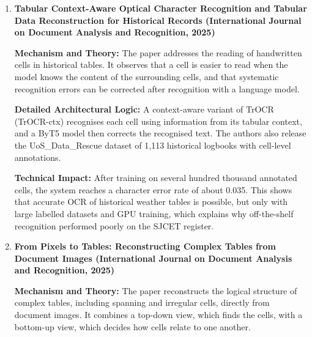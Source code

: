 \begin{enumerate}
\textbf{Detailed Architectural Logic:} A CascadeTabNet detector \cite{ref9} is trained on a small labelled set and then refined semi-supervised on unlabelled pages. The approach is evaluated on the GloSAT historical-logbook dataset together with the ICDAR-2019 and PubTabNet benchmarks.

\textbf{Technical Impact:} Semi-supervised training improves structure recognition on historical tables with limited annotation. The method recognises structure only, not cell text, so its errors propagate to the recognition stage and the output still needs validation. It informed the OCR route that was prototyped for the SJCET register.

\item \textbf{Tabular Context-Aware Optical Character Recognition and Tabular Data Reconstruction for Historical Records (International Journal on Document Analysis and Recognition, 2025)}

\textbf{Mechanism and Theory:} The paper addresses the reading of handwritten cells in historical tables. It observes that a cell is easier to read when the model knows the content of the surrounding cells, and that systematic recognition errors can be corrected after recognition with a language model.

\textbf{Detailed Architectural Logic:} A context-aware variant of TrOCR (TrOCR-ctx) recognises each cell using information from its tabular context, and a ByT5 model then corrects the recognised text. The authors also release the UoS\_Data\_Rescue dataset of 1,113 historical logbooks with cell-level annotations.

\textbf{Technical Impact:} After training on several hundred thousand annotated cells, the system reaches a character error rate of about 0.035. This shows that accurate OCR of historical weather tables is possible, but only with large labelled datasets and GPU training, which explains why off-the-shelf recognition performed poorly on the SJCET register.

\item \textbf{From Pixels to Tables: Reconstructing Complex Tables from Document Images (International Journal on Document Analysis and Recognition, 2025)}

\textbf{Mechanism and Theory:} The paper reconstructs the logical structure of complex tables, including spanning and irregular cells, directly from document images. It combines a top-down view, which finds the cells, with a bottom-up view, which decides how cells relate to one another.


\end{enumerate}
